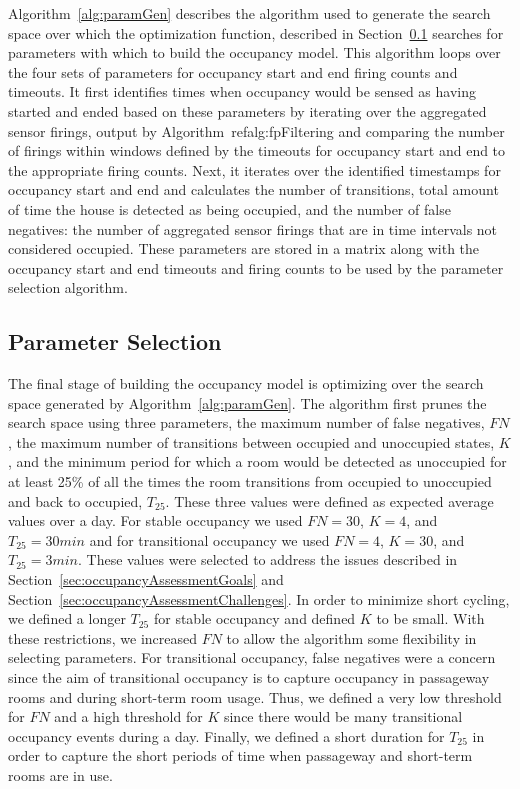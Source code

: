 Algorithm~\ref{alg:paramGen} describes the algorithm used to generate the search
space over which the optimization function, described in
Section~\ref{sec:paramExt} searches for parameters with which to build the
occupancy model. This algorithm loops over the four sets of parameters for
occupancy start and end firing counts and timeouts. It first identifies times
when occupancy would be sensed as having started and ended based on these
parameters by iterating over the aggregated sensor firings, output by
Algorithm~ref{alg:fpFiltering} and comparing the number of firings within
windows defined by the timeouts for occupancy start and end to the appropriate
firing counts. Next, it iterates over the identified timestamps for occupancy
start and end and calculates the number of transitions, total amount of time the
house is detected as being occupied, and the number of false negatives: the
number of aggregated sensor firings that are in time intervals not considered
occupied. These parameters are stored in a matrix along with the occupancy start
and end timeouts and firing counts to be used by the parameter selection
algorithm.

\subsection{Parameter Selection}
\label{sec:paramExt}

The final stage of building the occupancy model is optimizing over the search
space generated by Algorithm~\ref{alg:paramGen}. The algorithm first prunes the
search space using three parameters, the maximum number of false negatives,
$FN$, the maximum number of transitions between occupied and unoccupied states,
$K$, and the minimum period for which a room would be detected as unoccupied for
at least 25\% of all the times the room transitions from occupied to unoccupied
and back to occupied, $T_{25}$. These three values were defined as expected
average values over a day. For stable occupancy we used $FN = 30$, $K = 4$, and
$T_{25} = 30 min$ and for transitional occupancy we used $FN = 4$, $K = 30$, and
$T_{25} = 3 min$. These values were selected to address the issues described in
Section~\ref{sec:occupancyAssessmentGoals} and
Section~\ref{sec:occupancyAssessmentChallenges}. In order to minimize short
cycling, we defined a longer $T_{25}$ for stable occupancy and defined $K$ to be
small. With these restrictions, we increased $FN$ to allow the algorithm some
flexibility in selecting parameters. For transitional occupancy, false negatives
were a concern since the aim of transitional occupancy is to capture occupancy
in passageway rooms and during short-term room usage. Thus, we defined a very
low threshold for $FN$ and a high threshold for $K$ since there would be many
transitional occupancy events during a day. Finally, we defined a short duration
for $T_{25}$ in order to capture the short periods of time when passageway and
short-term rooms are in use. 

